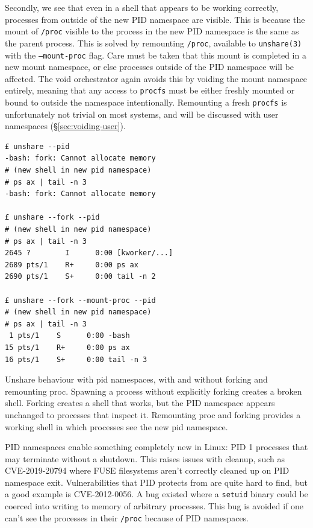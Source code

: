 \documentclass[12pt,a4paper,twoside]{report}
\begin{document}
Secondly, we see that even in a shell that appears to be working correctly, processes from outside of the new PID namespace are visible. This is because the mount of \texttt{/proc} visible to the process in the new PID namespace is the same as the parent process. This is solved by remounting \texttt{/proc}, available to \texttt{unshare(3)} with the \texttt{---mount-proc} flag. Care must be taken that this mount is completed in a new mount namespace, or else processes outside of the PID namespace will be affected. The void orchestrator again avoids this by voiding the mount namespace entirely, meaning that any access to \texttt{procfs} must be either freshly mounted or bound to outside the namespace intentionally. Remounting a fresh \texttt{procfs} is unfortunately not trivial on most systems, and will be discussed with user namespaces (§\ref{sec:voiding-user}).

\begin{listing}
\begin{verbatim}
£ unshare --pid
-bash: fork: Cannot allocate memory
# (new shell in new pid namespace)
# ps ax | tail -n 3
-bash: fork: Cannot allocate memory

£ unshare --fork --pid
# (new shell in new pid namespace)
# ps ax | tail -n 3
2645 ?        I      0:00 [kworker/...]
2689 pts/1    R+     0:00 ps ax
2690 pts/1    S+     0:00 tail -n 2

£ unshare --fork --mount-proc --pid
# (new shell in new pid namespace)
# ps ax | tail -n 3
 1 pts/1    S      0:00 -bash
15 pts/1    R+     0:00 ps ax
16 pts/1    S+     0:00 tail -n 3
\end{verbatim}

\caption{Unshare behaviour with pid namespaces, with and without forking and remounting proc. Spawning a process without explicitly forking creates a broken shell. Forking creates a shell that works, but the PID namespace appears unchanged to processes that inspect it. Remounting proc and forking provides a working shell in which processes see the new pid namespace.}
\label{lst:unshare-pid}
\end{listing}

PID namespaces enable something completely new in Linux: PID 1 processes that may terminate without a shutdown. This raises issues with cleanup, such as CVE-2019-20794 where FUSE filesystems aren't correctly cleaned up on PID namespace exit. Vulnerabilities that PID protects from are quite hard to find, but a good example is CVE-2012-0056. A bug existed where a \texttt{setuid} binary could be coerced into writing to memory of arbitrary processes. This bug is avoided if one can't see the processes in their \texttt{/proc} because of PID namespaces.
\end{document}
